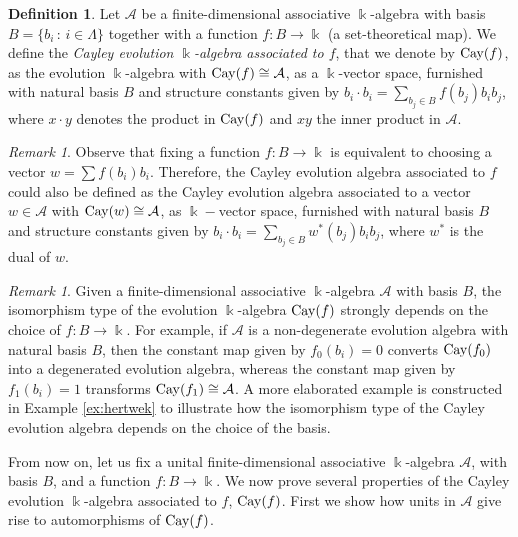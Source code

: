 \documentclass[a4paper,12pt]{amsart}
\theoremstyle{definition}
\newtheorem{definition}[theorem]{Definition}
\theoremstyle{remark}
\newtheorem{remark}[theorem]{Remark}
\newcommand{\Cay}{{\rm Cay}}
\newcommand{\A}{\mathcal{A}}
\begin{document}
\begin{definition}\label{def:cay}
Let $\A$ be a finite-dimensional associative $\Bbbk$-algebra with basis $B=\{b_i\,\colon\,i\in\Lambda\}$ together with a function $f:B\rightarrow\Bbbk$ 
(a set-theoretical map). We define the \textit{Cayley evolution  $\Bbbk$-algebra associated to $f$},  that we denote by $\Cay(f)$, as the evolution $\Bbbk$-algebra  with $\Cay(f)\cong \A$, as  a $\Bbbk$-vector space, furnished with natural basis $B$ and structure constants given by %
$b_i\cdot b_i=\sum_{b_j\in B}f(b_j)b_ib_j$, where  $x\cdot y$ denotes the product in $\Cay(f)$ and $xy$ the inner product in $\A$.
\end{definition}

\begin{remark}\label{rmk:cayley_con_vector}
Observe that fixing a function $f:B\rightarrow\Bbbk$ is equivalent to choosing a vector $w=\sum f(b_i)b_i$. Therefore,  the Cayley evolution algebra associated to $f$ could also be defined as the Cayley evolution algebra associated to a vector $w\in\A$ with $\Cay(w)\cong \A$, as $\Bbbk-$vector space, furnished with natural basis $B$ and structure constants given by $b_i\cdot b_i=\sum_{b_j\in B}w^*(b_j)b_ib_j$, where $w^*$ is the dual of $w$.
\end{remark}

\begin{remark}\label{rmk:diferentes_cayley}
Given a finite-dimensional associative $\Bbbk$-algebra $\A$ with basis $B$, the isomorphism type of the evolution $\Bbbk$-algebra $\Cay(f)$ strongly depends on the choice of $f:B\rightarrow\Bbbk$. For example, if $\A$ is  a non-degenerate evolution algebra with natural basis $B$, then the constant map given by $f_0(b_i)=0$ converts $\Cay(f_0)$ into a degenerated evolution algebra, whereas the constant map given by $f_1(b_i)=1$ transforms $\Cay(f_1)\cong\A$. A more elaborated example is constructed  in Example \ref{ex:hertwek} to illustrate  how the isomorphism type of the Cayley evolution algebra depends on the choice of the basis. 
\end{remark}


From now on, let us fix a unital finite-dimensional associative $\Bbbk$-algebra $\A$, with basis $B$, and a function $f:B\rightarrow\Bbbk$.  We now prove several properties of the Cayley evolution $\Bbbk$-algebra associated to $f$, $\Cay(f)$. First we show how units in $\A$ give rise to automorphisms of $\Cay(f)$.
\end{document}
